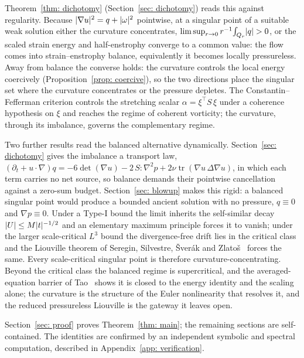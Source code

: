 Theorem~\ref{thm: dichotomy} (Section~\ref{sec: dichotomy}) reads this against
regularity. Because $\lvert \nabla u \rvert^2 = q + \lvert \omega \rvert^2$ pointwise, at a
singular point of a suitable weak solution either the curvature concentrates,
$\limsup_{r\to0} r^{-1}\!\int_{Q_r}\lvert q \rvert > 0$, or the scaled strain energy and
half-enstrophy converge to a common value: the flow comes into strain--enstrophy
balance, equivalently it becomes locally pressureless. Away from balance the
converse holds: the curvature controls the local energy coercively
(Proposition~\ref{prop: coercive}), so the two directions place the singular set
where the curvature concentrates or the pressure depletes. The
Constantin--Fefferman criterion controls the stretching scalar
$\alpha = \xi^{\top} S\,\xi$ under a coherence hypothesis on $\xi$ and reaches the
regime of coherent vorticity; the curvature, through its imbalance, governs the
complementary regime.

Two further results read the balanced alternative dynamically.
Section~\ref{sec: dichotomy} gives the imbalance a transport law,
$(\partial_t + u\cdot\nabla)q = -6\det(\nabla u) - 2\,S\!:\!\nabla^2 p
+ 2\nu\operatorname{tr}(\nabla u\,\Delta\nabla u)$, in which each term carries no
net source, so balance demands their pointwise cancellation against a zero-sum
budget. Section~\ref{sec: blowup} makes this rigid: a balanced singular point would
produce a bounded ancient solution with no pressure, $q\equiv0$ and
$\nabla p\equiv0$. Under a Type-I bound the limit inherits the self-similar decay
$\lvert U \rvert\le M\lvert t \rvert^{-1/2}$ and an elementary maximum principle forces it to
vanish; under the larger scale-critical $L^3$ bound the divergence-free drift lies
in the critical class and the Liouville theorem of Seregin, Silvestre, \v{S}ver\'ak
and Zlato\v{s}~\cite{seregin-2012-div-dri} forces the same. Every scale-critical
singular point is therefore curvature-concentrating. Beyond the critical class the
balanced regime is supercritical, and the averaged-equation barrier of
Tao~\cite{tao-2016-fin-tim-blo} shows it is closed to the energy identity and the
scaling alone; the curvature is the structure of the Euler nonlinearity that
resolves it, and the reduced pressureless Liouville is the gateway it leaves open.

Section~\ref{sec: proof} proves Theorem~\ref{thm: main}; the remaining sections
are self-contained. The identities are confirmed by an independent symbolic and
spectral computation, described in Appendix~\ref{app: verification}.
